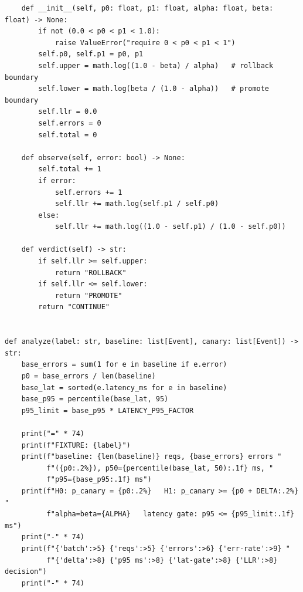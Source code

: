 \begin{verbatim}
    def __init__(self, p0: float, p1: float, alpha: float, beta: float) -> None:
        if not (0.0 < p0 < p1 < 1.0):
            raise ValueError("require 0 < p0 < p1 < 1")
        self.p0, self.p1 = p0, p1
        self.upper = math.log((1.0 - beta) / alpha)   # rollback boundary
        self.lower = math.log(beta / (1.0 - alpha))   # promote boundary
        self.llr = 0.0
        self.errors = 0
        self.total = 0

    def observe(self, error: bool) -> None:
        self.total += 1
        if error:
            self.errors += 1
            self.llr += math.log(self.p1 / self.p0)
        else:
            self.llr += math.log((1.0 - self.p1) / (1.0 - self.p0))

    def verdict(self) -> str:
        if self.llr >= self.upper:
            return "ROLLBACK"
        if self.llr <= self.lower:
            return "PROMOTE"
        return "CONTINUE"


def analyze(label: str, baseline: list[Event], canary: list[Event]) -> str:
    base_errors = sum(1 for e in baseline if e.error)
    p0 = base_errors / len(baseline)
    base_lat = sorted(e.latency_ms for e in baseline)
    base_p95 = percentile(base_lat, 95)
    p95_limit = base_p95 * LATENCY_P95_FACTOR

    print("=" * 74)
    print(f"FIXTURE: {label}")
    print(f"baseline: {len(baseline)} reqs, {base_errors} errors "
          f"({p0:.2%}), p50={percentile(base_lat, 50):.1f} ms, "
          f"p95={base_p95:.1f} ms")
    print(f"H0: p_canary = {p0:.2%}   H1: p_canary >= {p0 + DELTA:.2%}   "
          f"alpha=beta={ALPHA}   latency gate: p95 <= {p95_limit:.1f} ms")
    print("-" * 74)
    print(f"{'batch':>5} {'reqs':>5} {'errors':>6} {'err-rate':>9} "
          f"{'delta':>8} {'p95 ms':>8} {'lat-gate':>8} {'LLR':>8}  decision")
    print("-" * 74)


\end{verbatim}
